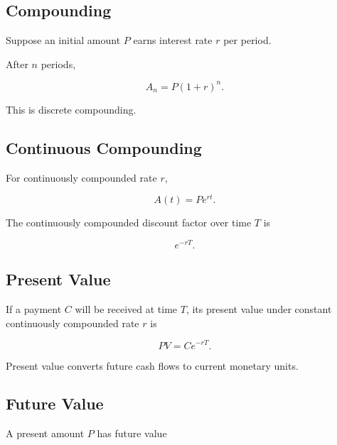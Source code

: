 \subsection{Compounding}
\label{subsec:financial-compounding}

Suppose an initial amount \(P\) earns interest rate \(r\) per period.

After \(n\) periods,

\[
\boxed{
A_n
=
P(1+r)^n.
}
\]

This is discrete compounding.

\subsection{Continuous Compounding}
\label{subsec:continuous-compounding}

For continuously compounded rate \(r\),

\[
\boxed{
A(t)
=
Pe^{rt}.
}
\]

The continuously compounded discount factor over time \(T\) is

\[
\boxed{
e^{-rT}.
}
\]

\subsection{Present Value}
\label{subsec:present-value}

If a payment \(C\) will be received at time \(T\), its present value under
constant continuously compounded rate \(r\) is

\[
\boxed{
PV
=
Ce^{-rT}.
}
\]

Present value converts future cash flows to current monetary units.

\subsection{Future Value}
\label{subsec:future-value}

A present amount \(P\) has future value

